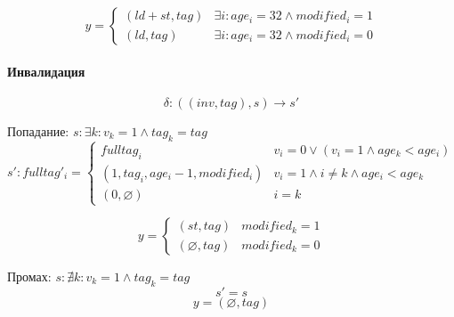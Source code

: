 \[
y =
\begin{cases}
	(ld+st,tag) & \exists i : age_i = 32 \land modified_i = 1 \\
	(ld,tag) & \exists i : age_i = 32 \land modified_i = 0
\end{cases}
\]

\paragraph*{Инвалидация}

$$\delta : ((inv,tag),s) \rightarrow s'$$

Попадание: $s: \exists k : v_k = 1 \land tag_k = tag$
\[
s':fulltag'_i =
\begin{cases}
	fulltag_i & v_i = 0 \lor (v_i = 1 \land age_k < age_i)\\
	(1,tag_i,age_{i}-1,modified_i) & v_i = 1 \land i \neq k \land age_i < age_k \\
	(0,\varnothing) & i = k
\end{cases}
\]

\[
y =
\begin{cases}
	(st,tag) & modified_k = 1 \\
	(\varnothing,tag) & modified_k = 0
\end{cases}
\]

Промах: $s: \nexists k : v_k = 1 \land tag_k = tag$
$$s' = s$$
$$y = (\varnothing,tag)$$



